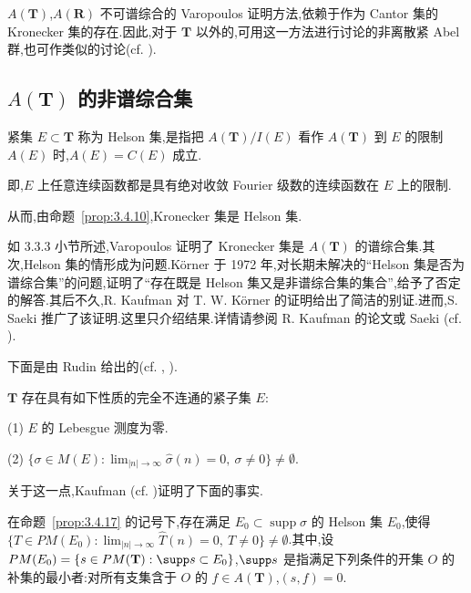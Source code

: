 \begin{note}\label{note:3.4.15}
$A(\mathbf{T})$,$A(\mathbf{R})$ 不可谱综合的 Varopoulos 证明方法,依赖于作为 Cantor 集的 Kronecker 集的存在.因此,对于 $\mathbf{T}$ 以外的,可用这一方法进行讨论的非离散紧 Abel 群,也可作类似的讨论(cf. \cite{ch3:52}).
\end{note}

\subsection{\texorpdfstring{$A(\mathbf{T})$ 的非谱综合集}{A(T) 的非谱综合集}}\label{sec:3.4.5}

\begin{definition}\label{def:3.4.16}
紧集 $E \subset \mathbf{T}$ 称为 Helson 集,是指把 $A(\mathbf{T})/I(E)$ 看作 $A(\mathbf{T})$ 到 $E$ 的限制 $A(E)$ 时,$A(E) = C(E)$ 成立.
\end{definition}

即,$E$ 上任意连续函数都是具有绝对收敛 Fourier 级数的连续函数在 $E$ 上的限制.

从而,由命题~\ref{prop:3.4.10},Kronecker 集是 Helson 集.

如 3.3.3 小节所述,Varopoulos \cite{ch3:50} 证明了 Kronecker 集是 $A(\mathbf{T})$ 的谱综合集.其次,Helson 集的情形成为问题.Körner \cite{ch3:33} 于 1972 年,对长期未解决的``Helson 集是否为谱综合集''的问题,证明了``存在既是 Helson 集又是非谱综合集的集合'',给予了否定的解答.其后不久,R. Kaufman 对 T. W. Körner 的证明给出了简洁的别证.进而,S. Saeki 推广了该证明.这里只介绍结果.详情请参阅 R. Kaufman 的论文或 Saeki \cite{ch3:45}(cf. \cite{ch3:46}).

下面是由 Rudin \cite{ch3:11} 给出的(cf. \cite{ch3:33}, \cite{ch3:42}).

\begin{proposition}\label{prop:3.4.17}
$\mathbf{T}$ 存在具有如下性质的完全不连通的紧子集 $E$:

(1) $E$ 的 Lebesgue 测度为零.

(2) $\{\sigma \in M(E): \lim_{|n| \to \infty}\widehat{\sigma}(n) = 0,\ \sigma \neq 0\} \neq \emptyset$.
\end{proposition}

关于这一点,Kaufman \cite{ch3:32}(cf. \cite{ch3:45})证明了下面的事实.

\begin{theorem}\label{thm:3.4.18}
在命题~\ref{prop:3.4.17} 的记号下,存在满足 $E_{0} \subset \operatorname{supp}\sigma$ 的 Helson 集 $E_{0}$,使得 $\{T \in PM(E_{0}): \lim_{|n| \to \infty}\widehat{T}(n) = 0,\ T \neq 0\} \neq \emptyset$.其中,设 $PM(E_{0}) = \{s \in PM(\mathbf{T}): \supp s \subset E_{0}\}$,$\supp s$ 是指满足下列条件的开集 $O$ 的补集的最小者:对所有支集含于 $O$ 的 $f \in A(\mathbf{T})$,$(s, f) = 0$.
\end{theorem}

